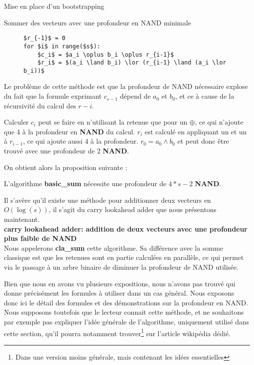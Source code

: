 \begin{section}{Mise en place d'un bootstrapping}
\begin{subsection}{Sommer des vecteurs avec une profondeur en NAND minimale}
\begin{figure}[!h]
\begin{lstlisting}
$r_{-1}$ = 0
for $i$ in range($s$):
	$c_i$ = $a_i \oplus b_i \oplus r_{i-1}$
	$r_i$ = $(a_i \land b_i) \lor (r_{i-1} \land (a_i \lor b_i))$
\end{lstlisting}
\end{figure}

	Le problème de cette méthode est que la profondeur de NAND nécessaire explose du fait que la formule exprimant $c_{s-1}$ dépend de $a_0$ et $b_0$, et ce à cause de la récursivité du calcul des $r-i$.

	Calculer $c_i$ peut se faire en n'utilisant la retenue que pour un $\oplus$, ce qui n'ajoute que 4 à la profondeur en \textbf{NAND} du calcul. $r_i$ est calculé en appliquant un  et un  à $r_{i-1}$, ce qui ajoute aussi 4 à la profondeur. $r_0 = a_0 \land b_0$ et peut donc être trouvé avec une profondeur de 2 \textbf{NAND}.
	
	On obtient alors la proposition suivante :
\begin{prop}
	L'algorithme \textbf{basic\_sum} nécessite une profondeur de $4*s - 2$ \textbf{NAND}.
\end{prop}


Il s'avère qu'il existe une méthode pour additionner deux vecteurs 
en $O(\log(s))$, il s'agit du carry lookahead adder que nous présentons maintenant. \\

\textbf{carry lookahead adder: addition de deux vecteurs avec une profondeur plus faible de
NAND} \\

Nous appelerons \textbf{cla\_sum} cette algorithme.
Sa différence avec la somme classique est que les retenues sont en partie 
calculées en parallèle, ce qui permet via le passage à un arbre
binaire de diminuer la profondeur de NAND utilisée.

Bien que nous en avons vu plusieurs expositions, nous n'avons pas 
trouvé qui donne précisément les formules à utiliser dans un cas
général. Nous exposons donc ici le détail des 
formules et des démonstrations sur la profondeur en NAND. 
Nous supposons toutefois que le lecteur connait cette méthode, 
et ne souhaitons par exemple pas expliquer l'idée générale de l'algorithme,
uniquement utilisé dans cette section, qu'il pourra notamment trouver\footnote{Dans une version moins générale, mais
contenant les idées essentielles} sur l'article wikipédia dédié\cite{wiki_cla}.



\end{subsection}
\end{section}
